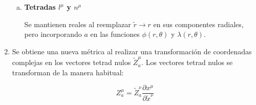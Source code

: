 \begin{enumerate}[1.]
\begin{note}
\begin{enumerate}[a.]
                  \item \textbf{Tetradas $l^\mu$ y $n^\mu$}

                        Se mantienen reales al reemplazar $\tilde{r} \rightarrow r$ en sus componentes radiales, pero incorporando $a$ en las funciones $\phi(r, \theta)$ y $\lambda(r, \theta)$.
              \end{enumerate}
          \end{note}




    \item Se obtiene una nueva métrica al realizar una transformación de coordenadas complejas en los vectores tetrad nulos $\tilde{Z}_a^\mu$. Los vectores tetrad nulos se transforman de la manera habitual:

          \begin{equation}
              Z_a^\mu = \tilde{Z}_a^\nu \frac{\partial x^\mu}{\partial \tilde{x}^\nu}
          \end{equation}


\end{enumerate}
